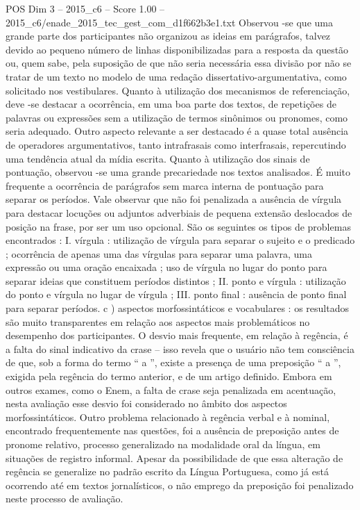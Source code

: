 \begin{textsample}{POS Dim 3 – 2015\_c6 – Score 1.00 – 2015\_c6/enade\_2015\_tec\_gest\_com\_d1f662b3e1.txt}
Observou -se que uma grande parte dos participantes não organizou as ideias em parágrafos, talvez devido ao pequeno número de linhas disponibilizadas para a resposta da questão ou, quem sabe, pela suposição de que não seria necessária essa divisão por não se tratar de um texto no modelo de uma redação dissertativo-argumentativa, como solicitado nos vestibulares.
Quanto à utilização dos mecanismos de referenciação, deve -se destacar a ocorrência, em uma boa parte dos textos, de repetições de palavras ou expressões sem a utilização de termos sinônimos ou pronomes, como seria adequado.
Outro aspecto relevante a ser destacado é a quase total ausência de operadores argumentativos, tanto intrafrasais como interfrasais, repercutindo uma tendência atual da mídia escrita.
Quanto à utilização dos sinais de pontuação, observou -se uma grande precariedade nos textos analisados.
É muito frequente a ocorrência de parágrafos sem marca interna de pontuação para separar os períodos.
Vale observar que não foi penalizada a ausência de vírgula para destacar locuções ou adjuntos adverbiais de pequena extensão deslocados de posição na frase, por ser um uso opcional.
São os seguintes os tipos de problemas encontrados : I. vírgula : utilização de vírgula para separar o sujeito e o predicado ; ocorrência de apenas uma das vírgulas para separar uma palavra, uma expressão ou uma oração encaixada ; uso de vírgula no lugar do ponto para separar ideias que constituem períodos distintos ; II. ponto e vírgula : utilização do ponto e vírgula no lugar de vírgula ; III. ponto final : ausência de ponto final para separar períodos. c ) aspectos morfossintáticos e vocabulares : os resultados são muito transparentes em relação aos aspectos mais problemáticos no desempenho dos participantes.
O desvio mais frequente, em relação à regência, é a falta do sinal indicativo da crase – isso revela que o usuário não tem consciência de que, sob a forma do termo “ a ”, existe a presença de uma preposição “ a ”, exigida pela regência do termo anterior, e de um artigo definido.
Embora em outros exames, como o Enem, a falta de crase seja penalizada em acentuação, nesta avaliação esse desvio foi considerado no âmbito dos aspectos morfossintáticos.
Outro problema relacionado à regência verbal e à nominal, encontrado frequentemente nas questões, foi a ausência de preposição antes de pronome relativo, processo generalizado na modalidade oral da língua, em situações de registro informal.
Apesar da possibilidade de que essa alteração de regência se generalize no padrão escrito da Língua Portuguesa, como já está ocorrendo até em textos jornalísticos, o não emprego da preposição foi penalizado neste processo de avaliação.

\end{textsample}
